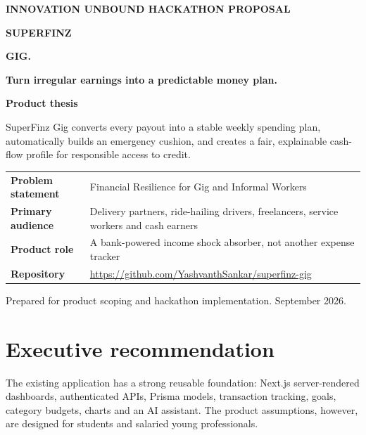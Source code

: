 \documentclass[10pt,a4paper]{article}
\begin{document}
\thispagestyle{empty}
\vspace*{8mm}

{\Large\bfseries\color{Accent} INNOVATION UNBOUND \hfill HACKATHON PROPOSAL}

\vspace{20mm}

{\fontsize{37}{39}\selectfont\bfseries SUPERFINZ\par}
{\fontsize{37}{39}\selectfont\bfseries\color{Accent} GIG.\par}

\vspace{8mm}
{\Large\bfseries Turn irregular earnings into a predictable money plan.}

\vspace{14mm}

\begin{herobox}
{\large\bfseries Product thesis}\par
\vspace{3mm}
SuperFinz Gig converts every payout into a stable weekly spending plan, automatically builds an emergency cushion, and creates a fair, explainable cash-flow profile for responsible access to credit.
\end{herobox}

\vfill

\begin{tabularx}{\textwidth}{>{\bfseries}p{34mm} X}
Problem statement & Financial Resilience for Gig and Informal Workers \\
Primary audience & Delivery partners, ride-hailing drivers, freelancers, service workers and cash earners \\
Product role & A bank-powered income shock absorber, not another expense tracker \\
Repository & \url{https://github.com/YashvanthSankar/superfinz-gig} \\
\end{tabularx}

\vspace{8mm}
{\small\color{InkSoft}Prepared for product scoping and hackathon implementation. September 2026.}

\newpage

\section{Executive recommendation}

The existing application has a strong reusable foundation: Next.js server-rendered dashboards, authenticated APIs, Prisma models, transaction tracking, goals, category budgets, charts and an AI assistant. The product assumptions, however, are designed for students and salaried young professionals.
\end{document}
